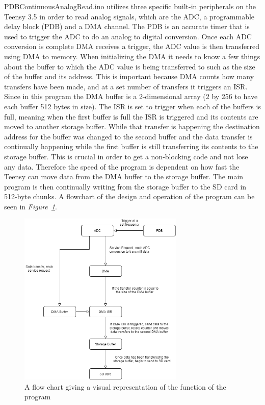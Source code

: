 PDBContinuousAnalogRead.ino utilizes three specific built-in peripherals on the Teensy 3.5 in order to read analog signals, which are the ADC, a programmable delay block (PDB) and a DMA channel.
The PDB is an accurate timer that is used to trigger the ADC to do an analog to digital conversion.
Once each ADC conversion is complete DMA receives a trigger, the ADC value is then transferred using DMA to memory.
When initializing the DMA it needs to know a few things about the buffer to which the ADC value is being transferred to such as the size of the buffer and its address. 
This is important because DMA counts how many transfers have been made, and at a set number of transfers it triggers an ISR.
Since in this program the DMA buffer is a 2-dimensional array (2 by 256 to have each buffer 512 bytes in size).
The ISR is set to trigger when each of the buffers is full, meaning when the first buffer is full the ISR is triggered and its contents are moved to another storage buffer.
While that transfer is happening the destination address for the buffer was changed to the second buffer and the data transfer is continually happening while the first buffer is still transferring its contents to the storage buffer.
This is crucial in order to get a non-blocking code and not lose any data.
Therefore the speed of the program is dependent on how fast the Teensy can move data from the DMA buffer to the storage buffer.
The main program is then continually writing from the storage buffer to the SD card in 512-byte chunks.
A flowchart of the design and operation of the program can be seen in \textit{Figure~\ref{fig:CodeFlow}}.

\begin{figure}[h]
    \centering
    \includegraphics[width=0.70\textwidth]{graphics/flowChart.png}
    \caption{A flow chart giving a visual representation of the function of the program}
    \label{fig:CodeFlow}
\end{figure}


